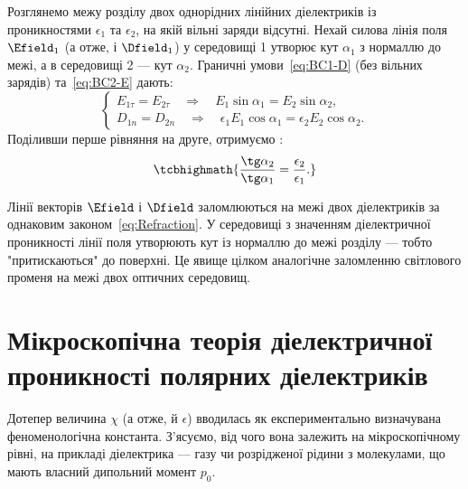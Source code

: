 Розглянемо межу розділу двох однорідних лінійних діелектриків із проникностями $\epsilon_1$ та $\epsilon_2$, на якій вільні заряди відсутні. Нехай
силова лінія поля $\Efield_1$ (а отже, і $\Dfield_1$) у середовищі 1 утворює кут $\alpha_1$ з нормаллю до межі, а в середовищі 2 --- кут $\alpha_2$.
Граничні умови~\eqref{eq:BC1-D} (без вільних зарядів) та~\eqref{eq:BC2-E} дають:
\begin{equation*}
	\begin{cases}
		E_{1\tau} = E_{2\tau} \quad\Longrightarrow\quad E_1\sin\alpha_1 = E_2\sin\alpha_2, \\
		D_{1n} = D_{2n} \quad\Longrightarrow\quad \epsilon_1 E_1\cos\alpha_1 = \epsilon_2 E_2\cos\alpha_2.
	\end{cases}
\end{equation*}
Поділивши перше рівняння на друге, отримуємо :
\begin{equation}\label{eq:Refraction}
	\tcbhighmath{
		\frac{\tg\alpha_2}{\tg\alpha_1} = \frac{\epsilon_2}{\epsilon_1}.
	}
\end{equation}

\begin{Attention}
	Лінії векторів $\Efield$ і $\Dfield$ заломлюються на межі двох діелектриків за однаковим законом~\eqref{eq:Refraction}. У середовищі з
	 значенням діелектричної проникності лінії поля утворюють  кут із нормаллю до межі розділу --- тобто "притискаються"
	до поверхні. Це явище цілком аналогічне заломленню світлового променя на межі двох оптичних середовищ.
\end{Attention}

\section{Мікроскопічна теорія діелектричної проникності полярних діелектриків}\label{sec:Langevin-Debye}

Дотепер величина $\chi$ (а отже, й $\epsilon$) вводилась як експериментально визначувана феноменологічна константа. З'ясуємо, від чого вона
залежить на мікроскопічному рівні, на прикладі  діелектрика --- газу чи розрідженої рідини з молекулами, що мають власний
дипольний момент $p_0$.

